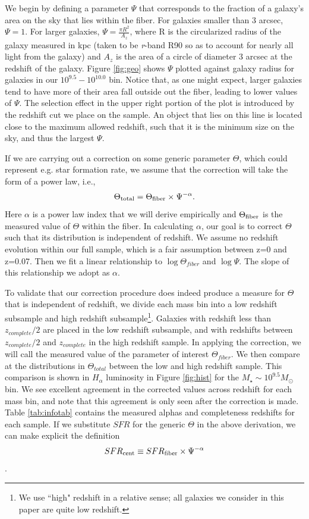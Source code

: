 \documentclass[iop]{emulateapj}
\begin{document}
We begin by defining a parameter $\Psi$ that corresponds to the fraction of a galaxy's area on the sky that lies within the fiber. For galaxies smaller than 3 arcsec, $\Psi = 1$. For larger galaxies, $\Psi = \frac{\pi R^2}{A_z}$, where R is the circularized radius of the galaxy measured in kpc (taken to be \textit{r}-band R90 so as to account for nearly all light from the galaxy) and $A_z$ is the area of a circle of diameter 3 arcsec at the redshift of the galaxy. Figure \ref{fig:geo} shows $\Psi$ plotted against galaxy radius for galaxies in our $10^{9.5}-10^{10.0}$ bin. Notice that, as one might expect, larger galaxies tend to have more of their area fall outside out the fiber, leading to lower values of $\Psi$. The selection effect in the upper right portion of the plot is introduced by the redshift cut we place on the sample. An object that lies on this line is located close to the maximum allowed redshift, such that it is the minimum size on the sky, and thus the largest $\Psi$. 

If we are carrying out a correction on some generic parameter $\Theta$, which could represent e.g. star formation rate, we assume that the correction will take the form of a power law, i.e., $$\Theta_{\rm total} = \Theta_{\rm fiber} \times \Psi^{-\alpha}.$$ Here $\alpha$ is a power law index that we will derive empirically and $\Theta_{\rm fiber}$ is the measured value of $\Theta$ within the fiber. In calculating $\alpha$, our goal is to correct $\Theta$ such that its distribution is independent of redshift. We assume no redshift evolution within our full sample, which is a fair assumption between z=0 and z=0.07. Then we fit a linear relationship to $\log \Theta_{fiber}$ and $\log \Psi$. The slope of this relationship we adopt as $\alpha$.

To validate that our correction procedure does indeed produce a measure for $\Theta$ that is independent of redshift, we divide each mass bin into a low redshift subsample and high redshift subsample\footnote{We use ``high" redshift in a relative sense; all galaxies we consider in this paper are quite low redshift.}. Galaxies with redshift less than $z_{complete}/2$ are placed in the low redshift subsample, and with redshifts between $z_{complete}/2$ and  $z_{complete}$ in the high redshift sample. In applying the correction, we will call the measured value of the parameter of interest $\Theta_{fiber}$. We then compare at the distributions in $\Theta_{total}$ between the low and high redshift sample. This comparison is shown in $H_\alpha$ luminosity in Figure \ref{fig:hist} for the $M_\star \sim 10^{9.5} M_{\odot}$ bin. We see excellent agreement in the corrected values across redshift for each mass bin, and note that this agreement is only seen after the correction is made. Table \ref{tab:infotab} contains the measured alphas and completeness redshifts for each sample. If we substitute $SFR$ for the generic $\Theta$ in the above derivation, we can make explicit the definition $$SFR_{\rm cent} \equiv SFR_{\rm fiber} \times \Psi^{-\alpha}$$.
\end{document}
